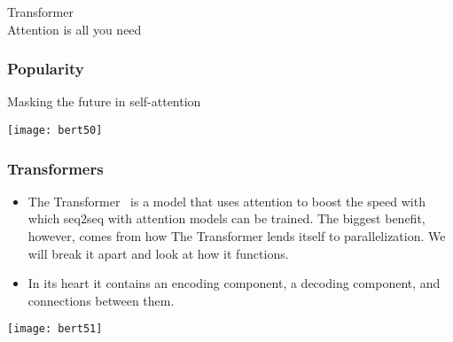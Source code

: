 \begin{frame}[fragile]\frametitle{}
\begin{center}
{\Large Transformer \\ \small Attention is all you need}
\end{center}
\end{frame}


\begin{frame}[fragile]\frametitle{Popularity}

Masking the future in self-attention

\begin{center}
\texttt{[image: bert50]}
\end{center}	

 
\end{frame}


\begin{frame}[fragile]\frametitle{Transformers}


\begin{itemize}
\item The Transformer  is a model that uses attention to boost the speed with which seq2seq with attention models can be trained. The biggest benefit, however, comes from how The Transformer lends itself to parallelization. We will break it apart and look at how it functions.
\item In its heart it contains an encoding component, a decoding component, and connections between them.
\end{itemize}	 

\begin{center}
\texttt{[image: bert51]}
\end{center}	

\end{frame}


